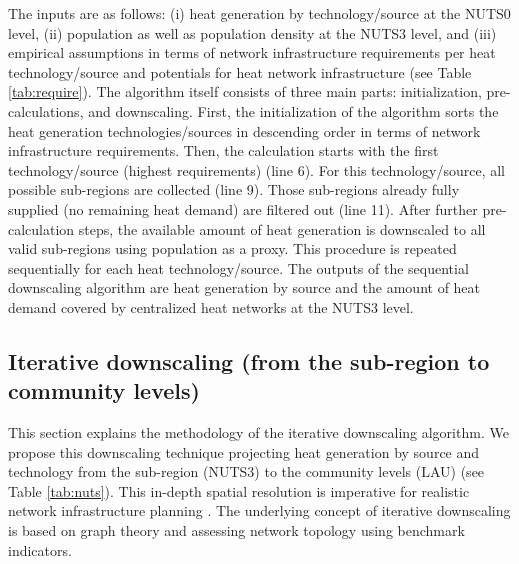 The inputs are as follows: (i) heat generation by technology/source at the NUTS0 level, (ii) population as well as population density at the NUTS3 level, and (iii) empirical assumptions in terms of network infrastructure requirements per heat technology/source and potentials for heat network infrastructure (see Table \ref{tab:require}). The algorithm itself consists of three main parts: initialization, pre-calculations, and downscaling. First, the initialization of the algorithm sorts the heat generation technologies/sources in descending order in terms of network infrastructure requirements. Then, the calculation starts with the first technology/source (highest requirements) (line 6). For this technology/source, all possible sub-regions are collected (line 9). Those sub-regions already fully supplied (no remaining heat demand) are filtered out (line 11). After further pre-calculation steps, the available amount of heat generation is downscaled to all valid sub-regions using population as a proxy. This procedure is repeated sequentially for each heat technology/source. The outputs of the sequential downscaling algorithm are heat generation by source and the amount of heat demand covered by centralized heat networks at the NUTS3 level.

\subsection{Iterative downscaling (from the sub-region to community levels)}\label{alg2}
This section explains the methodology of the iterative downscaling algorithm. We propose this downscaling technique projecting heat generation by source and technology from the sub-region (NUTS3) to the community levels (LAU) (see Table \ref{tab:nuts}). This in-depth spatial resolution is imperative for realistic network infrastructure planning \cite{zvoleff2009impact}. The underlying concept of iterative downscaling is based on graph theory and assessing network topology using benchmark indicators. 

